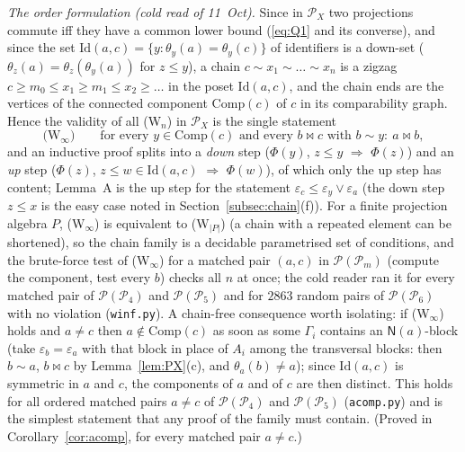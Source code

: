 \documentclass[11pt]{amsart}
\theoremstyle{definition}
\renewcommand{\P}{\mathcal{P}}
\newcommand{\N}{\mathsf{N}}
\newcommand{\mt}{\bowtie}   %
\begin{document}
\emph{The order formulation (cold read of 11~Oct).} Since in $\P_X$ two projections commute iff they have a common lower bound (\eqref{eq:Q1} and its converse), and since the set $\mathrm{Id}(a,c)=\{y:\theta_y(a)=\theta_y(c)\}$ of identifiers is a down-set ($\theta_z(a)=\theta_z(\theta_y(a))$ for $z\le y$), a chain $c\sim x_1\sim\dots\sim x_n$ is a zigzag $c\ge m_0\le x_1\ge m_1\le x_2\ge\dots$ in the poset $\mathrm{Id}(a,c)$, and the chain ends are the vertices of the connected component $\mathrm{Comp}(c)$ of $c$ in its comparability graph. Hence the validity of all (W$_n$) in $\P_X$ is the single statement
\[
\text{(W$_\infty$)}\qquad \text{for every } y\in\mathrm{Comp}(c) \text{ and every } b\mt c \text{ with } b\sim y:\ a\mt b,
\]
and an inductive proof splits into a \emph{down} step ($\Phi(y)$, $z\le y$ $\Rightarrow$ $\Phi(z)$) and an \emph{up} step ($\Phi(z)$, $z\le w\in\mathrm{Id}(a,c)$ $\Rightarrow$ $\Phi(w)$), of which only the up step has content; Lemma~A is the up step for the statement $\varepsilon_c\le\varepsilon_y\vee\varepsilon_a$ (the down step $z\le x$ is the easy case noted in Section~\ref{subsec:chain}(f)). For a finite projection algebra $P$, (W$_\infty$) is equivalent to (W$_{|P|}$) (a chain with a repeated element can be shortened), so the chain family is a decidable parametrised set of conditions, and the brute-force test of (W$_\infty$) for a matched pair $(a,c)$ in $\P(\P_m)$ (compute the component, test every $b$) checks all $n$ at once; the cold reader ran it for every matched pair of $\P(\P_4)$ and $\P(\P_5)$ and for $2863$ random pairs of $\P(\P_6)$ with no violation (\texttt{winf.py}). A chain-free consequence worth isolating: if (W$_\infty$) holds and $a\ne c$ then $a\notin\mathrm{Comp}(c)$ as soon as some $\Gamma_i$ contains an $\N(a)$-block (take $\varepsilon_b=\varepsilon_a$ with that block in place of $A_i$ among the transversal blocks: then $b\sim a$, $b\mt c$ by Lemma~\ref{lem:PX}(c), and $\theta_a(b)\ne a$); since $\mathrm{Id}(a,c)$ is symmetric in $a$ and $c$, the components of $a$ and of $c$ are then distinct. This holds for all ordered matched pairs $a\ne c$ of $\P(\P_4)$ and $\P(\P_5)$ (\texttt{acomp.py}) and is the simplest statement that any proof of the family must contain. (Proved in Corollary~\ref{cor:acomp}, for every matched pair $a\ne c$.)
\end{document}
